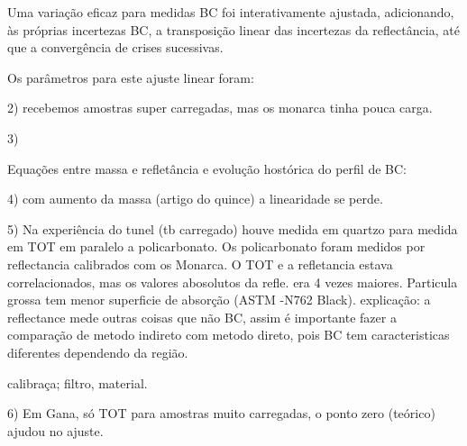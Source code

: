Uma variação eficaz para medidas BC foi interativamente ajustada, adicionando, às próprias incertezas BC, a transposição linear das incertezas da reflectância, até que a convergência de crises sucessivas.

Os parâmetros para este ajuste linear foram:





2) recebemos amostras super carregadas, mas os monarca tinha pouca carga.

3) 

Equações entre massa e refletância e evolução hostórica do perfil de BC:

4) com aumento da massa (artigo do quince) a linearidade se perde. 

5) Na experiência do tunel (tb carregado) houve medida em quartzo para medida
em TOT em paralelo a policarbonato. Os policarbonato foram medidos por reflectancia
calibrados com os Monarca. O TOT e a refletancia estava correlacionados, mas
os valores abosolutos da refle. era 4 vezes maiores.
Particula grossa tem menor superficie de absorção (ASTM -N762 Black). 
explicação: a reflectance mede outras coisas que não BC, assim é importante
fazer a comparação de metodo indireto com metodo direto, pois BC tem caracteristicas
diferentes dependendo da região.

calibraça; filtro, material.

6) Em Gana, só TOT para amostras muito carregadas, o ponto zero (teórico)
ajudou no ajuste.

